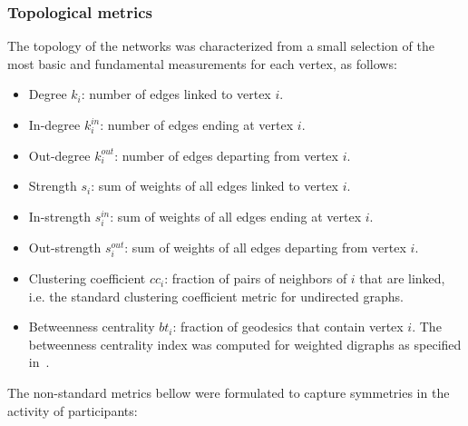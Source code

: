 \documentclass[%
	aip,
	jmp,%
	amsmath,amssymb,
	reprint,%
]{revtex4-1}
\begin{document}

\subsubsection{Topological metrics}\label{measures}

The topology of the networks was characterized 
from a small selection of the most basic and 
fundamental measurements for each vertex, as follows:

\begin{itemize}
	\item Degree     $k_i$: number of edges linked to vertex $i$.
	\item In-degree  $k_i^{in}$: number of edges ending at vertex $i$.
	\item Out-degree $k_i^{out}$: number of edges departing from vertex $i$.
	\item Strength $s_i$: sum of weights of all edges linked to vertex $i$.
	\item In-strength $s_i^{in}$: sum of weights of all edges ending at vertex $i$.
	\item Out-strength $s_i^{out}$: sum of weights of all edges departing from vertex $i$.
	\item Clustering coefficient $cc_i$: fraction of pairs of neighbors of $i$ that are linked, i.e. the standard clustering coefficient metric for undirected graphs.
	\item Betweenness centrality $bt_i$: fraction of geodesics that contain vertex $i$. The betweenness centrality index was computed for weighted digraphs as specified in~\cite{faster}.
\end{itemize}

The non-standard metrics bellow were formulated
to capture symmetries in the activity of participants:
\end{document}
